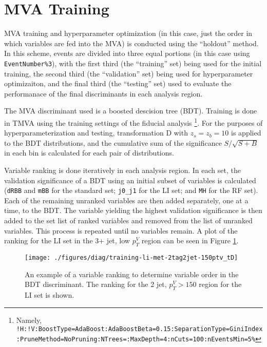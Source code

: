 \section{MVA Training}
MVA training and hyperparameter optimization (in this case, just the order in which variables are fed into the MVA) is conducted using the ``holdout'' method.
  In this scheme, events are divided into three equal portions (in this case using \texttt{EventNumber\%3}), with the first third (the ``training'' set) being used for the initial training, the second third (the ``validation'' set) being used for hyperparameter optimizaiton, and the final third (the ``testing'' set) used to evaluate the performanace of the final discriminants in each analysis region.

The MVA discriminant used is a boosted descision tree (BDT).  Training is done in TMVA using the training settings of the fiducial analysis \cite{supportnote}\footnote{Namely, \texttt{!H:\-!V:\-BoostType=\-AdaBoost:\-AdaBoostBeta=0.15:\-SeparationType=\-GiniIndex:\-PruneMethod=\-NoPruning:\-NTrees=:\-MaxDepth=4:\-nCuts=100:\-nEventsMin=5\%}}.  For the purposes of hyperparameterization and testing, transformation D with $z_s=z_b=10$ is applied to the BDT distributions, and the cumulative sum of the significance $S/\sqrt{S+B}$ in each bin is calculated for each pair of distributions.  

Variable ranking is done iteratively in each analysis region.  In each set, the validation significance of a BDT using an initial subset of variables is calculated (\texttt{dRBB} and \texttt{mBB} for the standard set; \texttt{j0\_j1} for the LI set; and \texttt{MH} for the RF set).  Each of the remaining unranked variables are then added separately, one at a time, to the BDT.  The variable yielding the highest validation significance is then added to the set list of ranked variables and removed from the list of unranked variables.  This process is repeated until no variables remain.  A plot of the ranking for the LI set in the 3+ jet, low $p_T^V$ region can be seen in Figure \ref{fig:rankingexample}.

\begin{figure}[!htbp]\captionsetup{justification=centering}
  \centering
  \texttt{[image: ./figures/diag/training-li-met-2tag2jet-150ptv\_tD]}
  \caption{An example of a variable ranking to determine variable order in the BDT discriminant.  The ranking for the 2 jet, $p_T^V>150$ \GeV region for the LI set is shown.}
  \label{fig:rankingexample}
\end{figure}

